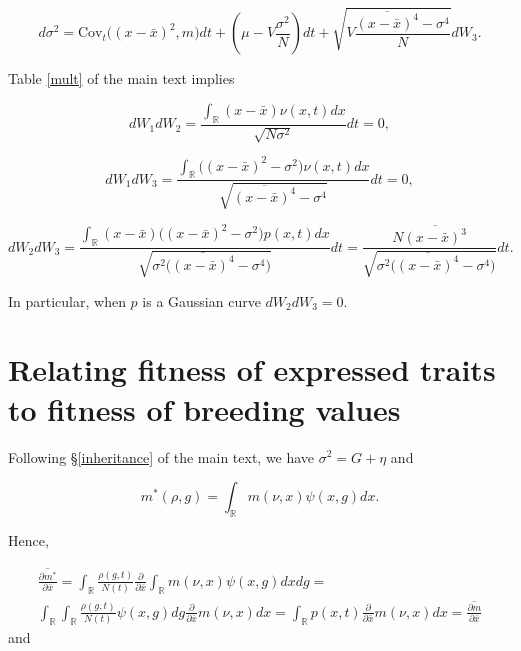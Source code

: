 \documentclass[]{article}
\begin{document}
\begin{equation}
d\sigma^2=\mathrm{Cov}_t\Big((x-\bar x)^2,m\Big)dt+\left(\mu-V\frac{\sigma^2}{N}\right)dt+\sqrt{V\frac{\overline{(x-\bar x)^4}-\sigma^4}{N}}d W_3.
\end{equation}

Table \ref{mult} of the main text implies

\begin{equation}
d W_1d W_2=\frac{\int_\mathbb{R}(x-\bar x)\nu(x,t)dx}{\sqrt{N\sigma^2}}dt=0,
\end{equation}

\begin{equation}
d W_1d W_3=\frac{\int_\mathbb{R}\big((x-\bar x)^2-\sigma^2\big)\nu(x,t)dx}{\sqrt{\overline{(x-\bar x)^4}-\sigma^4}}dt=0,
\end{equation}

\begin{equation}
d W_2d W_3=\frac{\int_\mathbb{R}(x-\bar x)\big((x-\bar x)^2-\sigma^2\big)p(x,t)dx}{\sqrt{\sigma^2\big(\overline{(x-\bar x)^4}-\sigma^4\big)}}dt
=\frac{N\overline{(x-\bar x)^3}}{\sqrt{\sigma^2\big(\overline{(x-\bar x)^4}-\sigma^4\big)}}dt.
\end{equation}

In particular, when \(p\) is a Gaussian curve \(d W_2d W_3=0\).

\hypertarget{relating-fitness-of-expressed-traits-to-fitness-of-breeding-values}{%
\section{\texorpdfstring{Relating fitness of expressed traits to fitness
of breeding values
\label{fit2fit}}{Relating fitness of expressed traits to fitness of breeding values }}\label{relating-fitness-of-expressed-traits-to-fitness-of-breeding-values}}

Following \S\ref{inheritance} of the main text, we have
\(\sigma^2=G+\eta\) and

\begin{equation}
m^*(\rho,g)=\int_\mathbb{R}m(\nu,x)\psi(x,g)dx.
\end{equation}

Hence,

\begin{multline}
\overline{\frac{\partial m^*}{\partial\bar x}}=\int_{\mathbb{R}}\frac{\rho(g,t)}{N(t)}\frac{\partial}{\partial\bar x}\int_\mathbb{R}m(\nu,x)\psi(x,g)dxdg= \\
\int_{\mathbb{R}}\int_\mathbb{R}\frac{\rho(g,t)}{N(t)}\psi(x,g)dg\frac{\partial}{\partial\bar x}m(\nu,x)dx=\int_\mathbb{R}p(x,t)\frac{\partial}{\partial\bar x}m(\nu,x)dx=\overline{\frac{\partial m}{\partial\bar x}}
\end{multline} and
\end{document}
